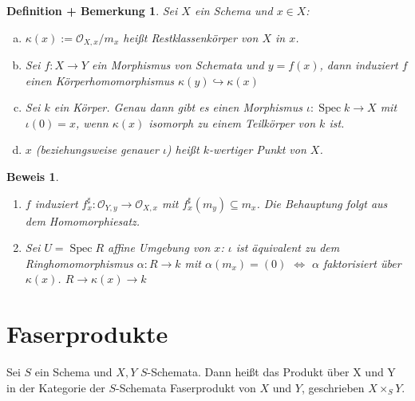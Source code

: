 \documentclass[a4paper,oneside]{scrbook}
\theoremstyle{break}
\newtheorem{DefBem}[Def]{Definition + Bemerkung}
\theoremstyle{nonumberbreak}
\theoremstyle{nonumberplain}
\newtheorem{Bew}{Beweis}
\theoremstyle{break}
\newcommand{\Spec}{%
	\ensuremath{\operatorname{Spec}}%
}
\begin{document}
\begin{DefBem}
\label{defbem:4.4}
Sei $X$ ein Schema und $x \in X$:
\begin{enumerate}[(a)]
	\item $\kappa(x):=\mathcal{O}_{X,x}/m_x$ heißt Restklassenkörper von $X$ in $x$.
	\item Sei $f: X \rightarrow Y$ ein Morphismus von Schemata und $y=f(x)$, dann induziert $f$ einen Körperhomomorphismus $\kappa(y) \hookrightarrow \kappa(x)$
	\item Sei $k$ ein Körper. Genau dann gibt es einen Morphismus $\iota: \Spec k \rightarrow X$ mit $\iota(0) = x$, wenn $\kappa(x)$ isomorph zu einem Teilkörper von $k$ ist.
	\item $x$ (beziehungsweise genauer $\iota$) heißt $k$-wertiger Punkt von $X$.
\end{enumerate}
\end{DefBem}
\begin{Bew}
	\begin{enumerate}
		\item[(b)] $f$ induziert $f^\sharp_x: \mathcal{O}_{Y,y} \rightarrow \mathcal{O}_{X,x}$ mit $f^\sharp_x(m_y) \subseteq m_x$. Die Behauptung folgt aus dem Homomorphiesatz.
		\item[(c)] Sei $U = \Spec R$ affine Umgebung von $x$: $\iota$ ist äquivalent zu dem Ringhomomorphismus $\alpha: R \rightarrow k $ mit $\alpha(m_x)=(0)$ $\Leftrightarrow$ $\alpha$ faktorisiert über $\kappa(x)$. $R \rightarrow \kappa(x) \rightarrow k$
	\end{enumerate}
\end{Bew}

\section{Faserprodukte}

Sei $S$ ein Schema und $X,Y$ $S$-Schemata. Dann heißt das Produkt über X und Y in der Kategorie der $S$-Schemata Faserprodukt von $X$ und $Y$, geschrieben $X \times_S Y$.
\end{document}
